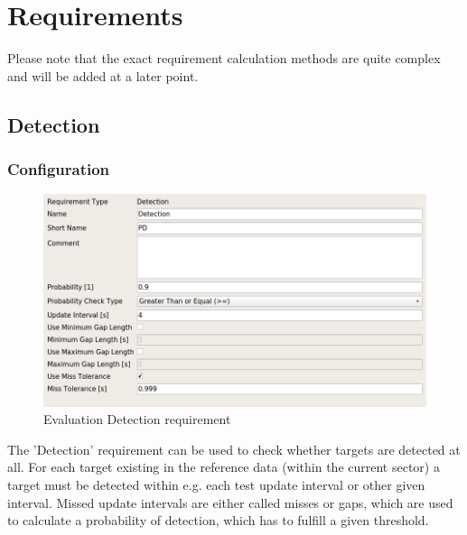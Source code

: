 \section{Requirements}
\label{sec:eval_requirements} 

Please note that the exact requirement calculation methods are quite complex and will be added at a later point. \\

\subsection{Detection}
\label{sec:eval_req_detection} 

\subsubsection{Configuration}

\begin{figure}[H]
    \includegraphics[width=14cm,frame]{../screenshots/eval_req_detection.png}
  \caption{Evaluation Detection requirement}
\end{figure}

The 'Detection' requirement can be used to check whether targets are detected at all. For each target existing in the reference data (within the current sector) a target must be detected within e.g. each test update interval or other given interval. Missed update intervals are either called misses or gaps, which are used to calculate a probability of detection, which has to fulfill a given threshold. \\

